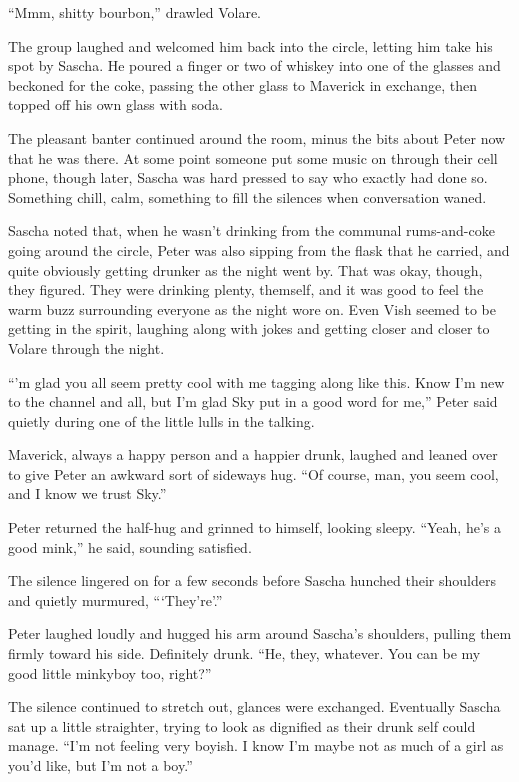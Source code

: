 ``Mmm, shitty bourbon,'' drawled Volare.

The group laughed and welcomed him back into the circle, letting him take his spot by Sascha. He poured a finger or two of whiskey into one of the glasses and beckoned for the coke, passing the other glass to Maverick in exchange, then topped off his own glass with soda.

The pleasant banter continued around the room, minus the bits about Peter now that he was there. At some point someone put some music on through their cell phone, though later, Sascha was hard pressed to say who exactly had done so. Something chill, calm, something to fill the silences when conversation waned.

Sascha noted that, when he wasn't drinking from the communal rums-and-coke going around the circle, Peter was also sipping from the flask that he carried, and quite obviously getting drunker as the night went by. That was okay, though, they figured. They were drinking plenty, themself, and it was good to feel the warm buzz surrounding everyone as the night wore on. Even Vish seemed to be getting in the spirit, laughing along with jokes and getting closer and closer to Volare through the night.

``'m glad you all seem pretty cool with me tagging along like this. Know I'm new to the channel and all, but I'm glad Sky put in a good word for me,'' Peter said quietly during one of the little lulls in the talking.

Maverick, always a happy person and a happier drunk, laughed and leaned over to give Peter an awkward sort of sideways hug. ``Of course, man, you seem cool, and I know we trust Sky.''

Peter returned the half-hug and grinned to himself, looking sleepy. ``Yeah, he's a good mink,'' he said, sounding satisfied.

The silence lingered on for a few seconds before Sascha hunched their shoulders and quietly murmured, ```They're'.''

Peter laughed loudly and hugged his arm around Sascha's shoulders, pulling them firmly toward his side. Definitely drunk. ``He, they, whatever. You can be my good little minkyboy too, right?''

The silence continued to stretch out, glances were exchanged.  Eventually Sascha sat up a little straighter, trying to look as dignified as their drunk self could manage. ``I'm not feeling very boyish. I know I'm maybe not as much of a girl as you'd like, but I'm not a boy.''

